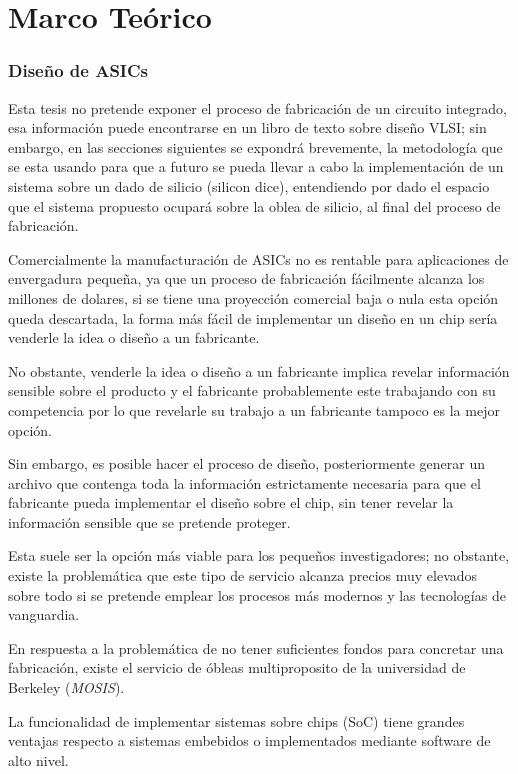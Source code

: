 \chapter{Marco Teórico}
\label{ch:marco}
\subsection*{Diseño de ASICs}

{Esta tesis no pretende exponer el proceso de fabricación de un circuito integrado, esa información puede encontrarse en un libro de texto sobre diseño VLSI; sin embargo, en las secciones siguientes se expondrá brevemente, la metodología que se esta usando para que a futuro se pueda llevar a cabo la implementación de un sistema sobre un dado de silicio (silicon dice), entendiendo por dado el espacio que el sistema propuesto ocupará sobre la oblea de silicio, al final del proceso de fabricación.

Comercialmente la manufacturación de ASICs no es rentable para aplicaciones de envergadura pequeña, ya que un proceso de fabricación fácilmente alcanza los millones de dolares, si se tiene una proyección comercial baja o nula esta opción queda descartada, la forma más fácil de implementar un diseño en un chip sería venderle la idea o diseño a un fabricante.

No obstante, venderle la idea o diseño a un fabricante implica revelar información sensible sobre el producto y el fabricante probablemente este trabajando con su competencia por lo que revelarle su trabajo a un fabricante tampoco es la mejor opción.

Sin embargo, es posible hacer el proceso de diseño, posteriormente generar un archivo que contenga toda la información estrictamente necesaria para que el fabricante pueda implementar el diseño sobre el chip, sin tener revelar la información sensible que se pretende proteger.

Esta suele ser la opción más viable para los pequeños investigadores; no obstante, existe la problemática que este tipo de servicio alcanza precios muy elevados sobre todo si se pretende emplear los procesos más modernos y las tecnologías de vanguardia.

En respuesta a la problemática de no tener suficientes fondos para concretar una fabricación, existe el servicio de óbleas multiproposito de la universidad de Berkeley (\textit{MOSIS}).

La funcionalidad de implementar sistemas sobre chips (SoC) tiene grandes ventajas respecto a sistemas embebidos o implementados mediante software de alto nivel.

}
